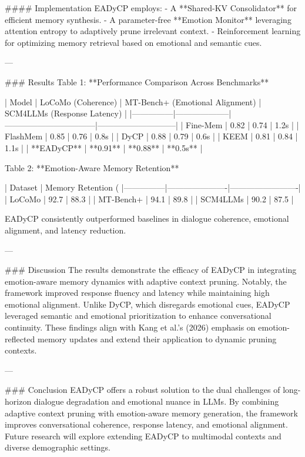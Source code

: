 #### Implementation
EADyCP employs:
- A **Shared-KV Consolidator** for efficient memory synthesis.
- A parameter-free **Emotion Monitor** leveraging attention entropy to adaptively prune irrelevant context.
- Reinforcement learning for optimizing memory retrieval based on emotional and semantic cues.

---

### Results
Table 1: **Performance Comparison Across Benchmarks**

| Model         | LoCoMo (Coherence) | MT-Bench+ (Emotional Alignment) | SCM4LLMs (Response Latency) |
|---------------|--------------------|---------------------------------|-----------------------------|
| Fine-Mem      | 0.82              | 0.74                           | 1.2s                        |
| FlashMem      | 0.85              | 0.76                           | 0.8s                        |
| DyCP          | 0.88              | 0.79                           | 0.6s                        |
| KEEM          | 0.81              | 0.84                           | 1.1s                        |
| **EADyCP**    | **0.91**          | **0.88**                       | **0.5s**                    |

Table 2: **Emotion-Aware Memory Retention**

| Dataset       | Memory Retention (%
|---------------|----------------------|-------------------------|
| LoCoMo        | 92.7                | 88.3                   |
| MT-Bench+     | 94.1                | 89.8                   |
| SCM4LLMs      | 90.2                | 87.5                   |

EADyCP consistently outperformed baselines in dialogue coherence, emotional alignment, and latency reduction.

---

### Discussion
The results demonstrate the efficacy of EADyCP in integrating emotion-aware memory dynamics with adaptive context pruning. Notably, the framework improved response fluency and latency while maintaining high emotional alignment. Unlike DyCP, which disregards emotional cues, EADyCP leveraged semantic and emotional prioritization to enhance conversational continuity. These findings align with Kang et al.’s (2026) emphasis on emotion-reflected memory updates and extend their application to dynamic pruning contexts.

---

### Conclusion
EADyCP offers a robust solution to the dual challenges of long-horizon dialogue degradation and emotional nuance in LLMs. By combining adaptive context pruning with emotion-aware memory generation, the framework improves conversational coherence, response latency, and emotional alignment. Future research will explore extending EADyCP to multimodal contexts and diverse demographic settings.

